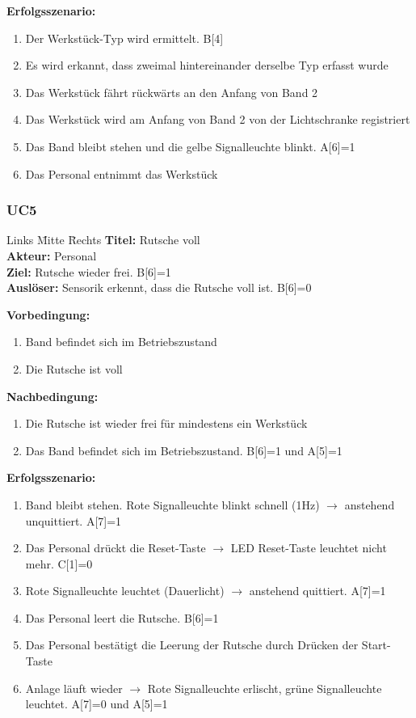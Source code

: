 \documentclass[oneside,a4paper,titlepage]{scrartcl}              %
\begin{document}
\textbf{Erfolgsszenario:}
\begin{enumerate}
  \item Der Werkstück-Typ wird ermittelt. B[4]
  \item Es wird erkannt, dass zweimal hintereinander derselbe Typ erfasst wurde
  \item Das Werkstück fährt rückwärts an den Anfang von Band 2
  \item Das Werkstück wird am Anfang von Band 2 von der Lichtschranke registriert
  \item Das Band bleibt stehen und die gelbe Signalleuchte blinkt. A[6]=1
  \item Das Personal entnimmt das Werkstück
\end{enumerate}

\subsubsection{UC5}
\begin{tabbing}
  Links \= Mitte \= Rechts \kill
  \textbf{Titel:}    \> \> Rutsche voll\\
  \textbf{Akteur:}   \> \> Personal\\
  \textbf{Ziel:}     \> \> Rutsche wieder frei. B[6]=1\\
  \textbf{Auslöser:} \> \> Sensorik erkennt, dass die Rutsche voll ist. B[6]=0\\
\end{tabbing}

\textbf{Vorbedingung:}
\begin{enumerate}
  \item Band befindet sich im Betriebszustand
  \item Die Rutsche ist voll
\end{enumerate}

\textbf{Nachbedingung:}
\begin{enumerate}
  \item Die Rutsche ist wieder frei für mindestens ein Werkstück
  \item Das Band befindet sich im Betriebszustand. B[6]=1 und A[5]=1
\end{enumerate}

\textbf{Erfolgsszenario:}
\begin{enumerate}
  \item Band bleibt stehen. Rote Signalleuchte blinkt schnell (1Hz) $\rightarrow$ anstehend unquittiert. A[7]=1
  \item Das Personal drückt die Reset-Taste $\rightarrow$ LED Reset-Taste leuchtet nicht mehr. C[1]=0
  \item Rote Signalleuchte leuchtet (Dauerlicht) $\rightarrow$ anstehend quittiert. A[7]=1
  \item Das Personal leert die Rutsche. B[6]=1
  \item Das Personal bestätigt die Leerung der Rutsche durch Drücken der Start-Taste
  \item Anlage läuft wieder $\rightarrow$ Rote Signalleuchte erlischt, grüne Signalleuchte leuchtet. A[7]=0 und A[5]=1
\end{enumerate}
\end{document}
